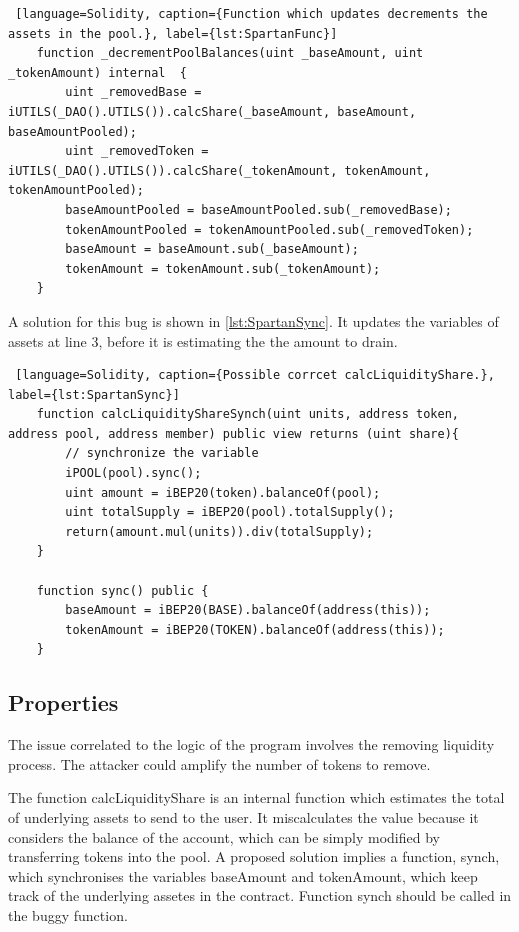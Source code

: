 \begin{lstlisting} [language=Solidity, caption={Function which updates decrements the assets in the pool.}, label={lst:SpartanFunc}]
    function _decrementPoolBalances(uint _baseAmount, uint _tokenAmount) internal  {
        uint _removedBase = iUTILS(_DAO().UTILS()).calcShare(_baseAmount, baseAmount, baseAmountPooled);
        uint _removedToken = iUTILS(_DAO().UTILS()).calcShare(_tokenAmount, tokenAmount, tokenAmountPooled);
        baseAmountPooled = baseAmountPooled.sub(_removedBase);
        tokenAmountPooled = tokenAmountPooled.sub(_removedToken); 
        baseAmount = baseAmount.sub(_baseAmount);
        tokenAmount = tokenAmount.sub(_tokenAmount); 
    }
\end{lstlisting}
A solution for this bug is shown in \autoref{lst:SpartanSync}. It updates the variables of assets at line 3, before it is estimating the 
the amount to drain.
\begin{lstlisting} [language=Solidity, caption={Possible corrcet calcLiquidityShare.}, label={lst:SpartanSync}]
    function calcLiquidityShareSynch(uint units, address token, address pool, address member) public view returns (uint share){
        // synchronize the variable
        iPOOL(pool).sync();  
        uint amount = iBEP20(token).balanceOf(pool);
        uint totalSupply = iBEP20(pool).totalSupply();
        return(amount.mul(units)).div(totalSupply);
    }

    function sync() public {
        baseAmount = iBEP20(BASE).balanceOf(address(this));
        tokenAmount = iBEP20(TOKEN).balanceOf(address(this));
    }
\end{lstlisting}
\subsection{Properties}
The issue correlated to the logic of the program involves the removing liquidity process. 
The attacker could amplify the number of tokens to remove.

The function calcLiquidityShare is an internal function which estimates the total of underlying assets to send to the user. 
It miscalculates the value because it considers the balance of the account, which can be simply modified by transferring tokens into the pool.
A proposed solution implies a function, synch, which synchronises the variables baseAmount and tokenAmount, which keep track of the underlying assetes in the contract. 
Function synch should be called in the buggy function.

